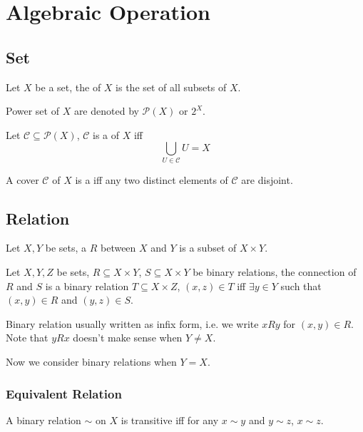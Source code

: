 \section{Algebraic Operation}

\subsection{Set}
\begin{defi}
Let $X$ be a set, the  of $X$ is the set of all subsets of $X$.
\end{defi}

Power set of $X$ are denoted by $\mathcal P(X)$ or $2^X$.

\begin{defi}[cover]
Let $\mathcal C \subseteq \mathcal P(X)$, $\mathcal C$ is a  of $X$ iff
$$\bigcup_{U \in \mathcal C} U = X$$
\end{defi}

\begin{defi}[partition]
A cover $\mathcal C$ of $X$ is a  iff any two distinct elements of $\mathcal C$
are disjoint.
\end{defi}

\subsection{Relation}
\begin{defi}
Let $X, Y$ be sets, a  $R$ between $X$ and $Y$ is a subset of $X \times Y$.
\end{defi}

\begin{defi}[connection]
Let $X, Y, Z$ be sets, $R \subseteq X \times Y$, $S \subseteq X \times Y$ be binary relations,
the connection of $R$ and $S$ is a binary relation $T \subseteq X \times Z$,
$(x, z) \in T$ iff $\exists y \in Y$ such that $(x, y) \in R$ and $(y, z) \in S$.
\end{defi}

Binary relation usually written as infix form, i.e. we write $x R y$ for $(x, y) \in R$.
Note that $y R x$ doesn't make sense when $Y \neq X$.

Now we consider binary relations when $Y = X$.

\subsubsection{Equivalent Relation}
\begin{defi}[transitive]
A binary relation $\sim$ on $X$ is transitive iff for any $x \sim y$ and $y \sim z$,
$x \sim z$.
\end{defi}

